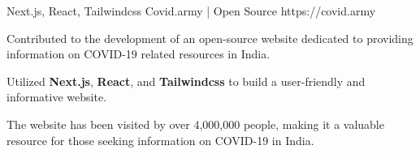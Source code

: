\begin{cventries}


\cventry
{Next.js, React, Tailwindcss } %
{Covid.army | Open Source } %
{https://covid.army } %
{} %
{
	\begin{cvitems} %
		\item {Contributed to the development of an open-source website dedicated to providing information on COVID-19 related resources in India.}
		\item {Utilized \textbf{Next.js}, \textbf{React}, and \textbf{Tailwindcss} to build a user-friendly and informative website.}
		\item {The website has been visited by over 4,000,000 people, making it a valuable resource for those seeking information on COVID-19 in India.}
	\end{cvitems}
}


\end{cventries}
